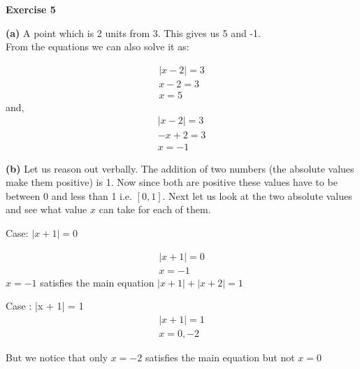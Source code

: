 \documentclass[10pt]{article}
\begin{document}
\begin{center}
\end{center}

\textbf{Exercise 5}

\textbf{(a)}
A point which is 2 units from 3. This gives us 5 and -1.\\

From the equations we can also solve it as:

\begin{gather*}
|x - 2| = 3\\
x - 2 = 3\\
x = 5  
\end{gather*}
and,
\begin{gather*}
|x - 2| = 3\\
-x + 2 = 3\\
x = -1
\end{gather*}

\textbf{(b)}
Let us reason out verbally. The addition of two numbers (the absolute values make them positive) is 1. 
Now since both are positive these values have to be between 0 and less than 1 i.e. $[0,1]$. Next let us look at the 
two absolute values and see what value $x$ can take for each of them.

Case: $|x + 1| = 0$

\begin{gather*}
|x + 1| = 0\\
x = -1
\end{gather*}
$x = -1$ satisfies the main equation $|x + 1| + |x + 2| = 1$ 

Case : |x + 1| = 1
\begin{gather*}
|x + 1| = 1\\
x = 0, -2
\end{gather*}

But we notice that only $x = -2$ satisfies the main equation but not $x = 0$
\end{document}
